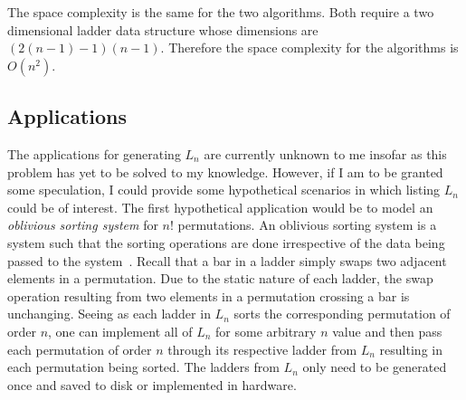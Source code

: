     The space complexity is the same for the two algorithms. Both require a two dimensional ladder data structure whose dimensions 
    are $(2(n-1)-1)(n-1)$. Therefore the space complexity for the algorithms is $O(n^{2})$.

    \subsection{Applications}
    The applications for generating $L_{n}$ are currently unknown to me insofar as this problem has yet to be solved to my knowledge. 
    However, if I am to be granted some speculation, I could provide some hypothetical scenarios in which listing $L_{n}$ could 
    be of interest. The first hypothetical application would be to model an \emph{oblivious sorting system} for $n!$ permutations. An oblivious 
    sorting system is a system such that the sorting operations are done irrespective of the data being passed to the system~\cite{A7}. Recall 
    that a bar in a ladder simply swaps two adjacent elements in a permutation. Due to the static nature of each ladder, the swap operation 
    resulting from two elements in a permutation crossing a bar is unchanging. 
    Seeing as each ladder in $L_{n}$ sorts the corresponding permutation of order $n$, one can implement all of $L_{n}$ 
    for some arbitrary $n$ value and then pass each permutation of order $n$ through its respective ladder from $L_{n}$ 
    resulting in each permutation being sorted. The ladders from $L_{n}$ only need to be generated once and saved to disk 
    or implemented in hardware. 